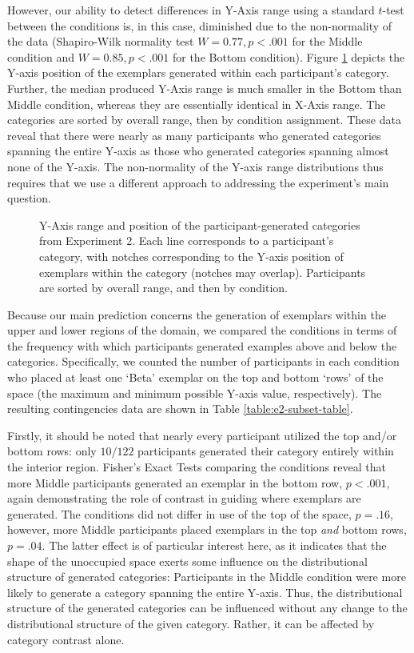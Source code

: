 \documentclass[12pt]{article}
\newcommand\inputpgf[2]{{
\let\pgfimageWithoutPath\pgfimage
\renewcommand{\pgfimage}[2][]{\pgfimageWithoutPath[##1]{#1/##2}}

}}
\begin{document}
\begin{flushleft}
However, our ability to detect differences in Y-Axis range using a standard
$t$-test between the conditions is, in this case, diminished due to the
non-normality of the data (Shapiro-Wilk normality test $W=0.77, p < .001$ for
the Middle condition and $W=0.85, p < .001$ for the Bottom condition). Figure
\ref{fig:e2-yranges} depicts the Y-axis position of the exemplars generated
within each participant's category. Further, the median produced Y-Axis range is much smaller in the Bottom than Middle condition, whereas they are essentially identical in X-Axis range. The categories are sorted by overall range,
then by condition assignment. These data reveal that there were nearly as many
participants who generated categories spanning the entire Y-axis as those who
generated categories spanning almost none of the Y-axis. The non-normality of
the Y-axis range distributions thus requires that we use a different approach to
addressing the experiment's main question.

\begin{figure}
    \begin{center} \inputpgf{figs/}{e2-yranges.pgf}
    \caption{Y-Axis range and position of the participant-generated categories
from Experiment 2. Each line corresponds to a participant's category, with
notches corresponding to the Y-axis position of exemplars within the category
(notches may overlap). Participants are sorted by overall range, and then by
condition. }
    \label{fig:e2-yranges}
    \end{center}
\end{figure}

Because our main prediction concerns the generation of exemplars within the
upper and lower regions of the domain, we compared the conditions in terms of
the frequency with which participants generated examples above and below the
categories. Specifically, we counted the number of participants in each
condition who placed at least one `Beta' exemplar on the top and bottom `rows'
of the space (the maximum and minimum possible Y-axis value, respectively). The
resulting contingencies data are shown in Table \ref{table:e2-subset-table}.

Firstly, it should be noted that nearly every participant utilized the top
and/or bottom rows: only $10 / 122$ participants generated their category
entirely within the interior region. Fisher's Exact Tests comparing the
conditions reveal that more Middle participants generated an exemplar in the
bottom row, $p < .001$, again demonstrating the role of contrast in guiding
where exemplars are generated. The conditions did not differ in use of the top
of the space, $p = .16$, however, more Middle participants placed exemplars in
the top {\em and} bottom rows, $p = .04$. The latter effect is of particular interest
here, as it indicates that the shape of the unoccupied space exerts some
influence on the distributional structure of generated categories: Participants
in the Middle condition were more likely to generate a category spanning the
entire Y-axis. Thus, the distributional structure of the generated categories
can be influenced without any change to the distributional structure of the
given category. Rather, it can be affected by category contrast alone.


\end{flushleft}
\end{document}
